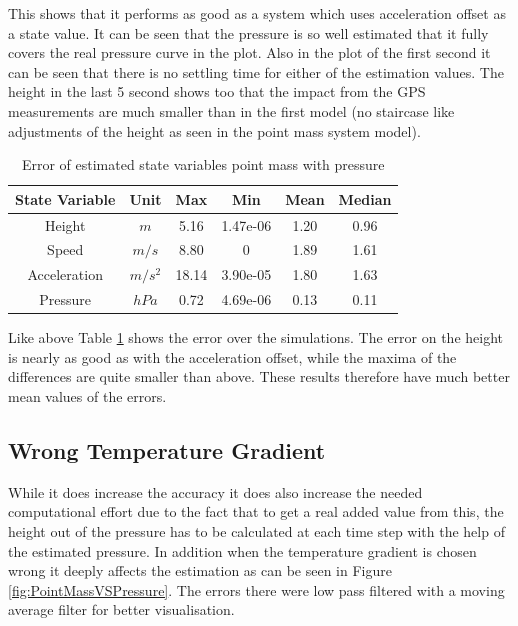 This shows that it performs as good as a system which uses acceleration offset as a state value.
It can be seen that the pressure is so well estimated that it fully covers the real pressure curve in the plot.
Also in the plot of the first second it can be seen that there is no settling time for either of the estimation values.
The height in the last 5 second shows too that the impact from the GPS measurements are much smaller than in the first model (no staircase like adjustments of the height as seen in the point mass system model).

\begin{table}[h!]
\centering
\begin{tabular}{cccccc}
\hline
\multicolumn{1}{|c|}{State Variable} & \multicolumn{1}{c|}{Unit} & \multicolumn{1}{c|}{Max} & \multicolumn{1}{c|}{Min} & \multicolumn{1}{c|}{Mean} & \multicolumn{1}{c|}{Median} \\ \hline
Height                            & $m$                         & 5.16                   & 1.47e-06                 & 1.20                    & 0.96                      \\
Speed                             & $m/s$                       & 8.80                   & 0                        & 1.89                    & 1.61                      \\
Acceleration                      & $m/s^2$   			& 18.14                  & 3.90e-05                 & 1.80                    & 1.63                      \\
Pressure                  	  & $hPa$   			& 0.72                   & 4.69e-06                 & 0.13                    & 0.11
\end{tabular}
\caption{Error of estimated state variables point mass with pressure}
\label{tab:ErrorPointMassPressure}
\end{table}

Like above Table \ref{tab:ErrorPointMassPressure} shows the error over the simulations.
The error on the height is nearly as good as with the acceleration offset, while the maxima of the differences are quite smaller than above.
These results therefore have much better mean values of the errors.

\newpage
\subsection{Wrong Temperature Gradient}
While it does increase the accuracy it does also increase the needed computational effort due to the fact that to get a real added value from this,
the height out of the pressure has to be calculated at each time step with the help of the estimated pressure.
In addition when the temperature gradient is chosen wrong it deeply affects the estimation as can be seen in Figure \ref{fig:PointMassVSPressure}.
The errors there were low pass filtered with a moving average filter for better visualisation.

